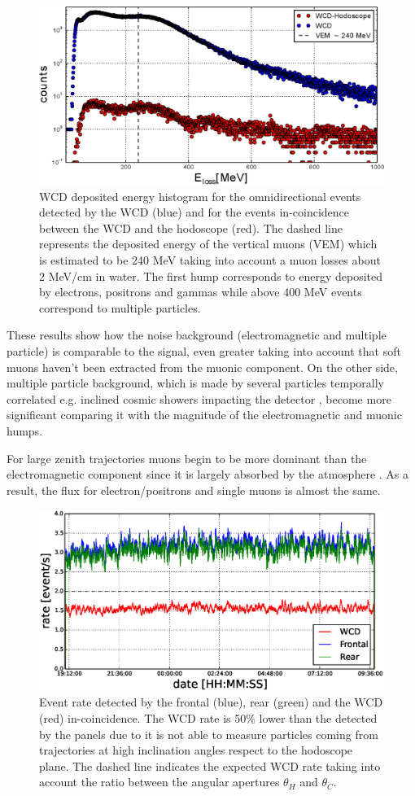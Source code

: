 \documentclass[letterpaper,11pt]{article}
\begin{document}
\begin{figure}[htb]
\centering
\includegraphics[width=0.7\columnwidth]{Figures/WCDHod.eps}
\caption{WCD deposited energy histogram for the omnidirectional events detected by the WCD (blue) and for the events in-coincidence between the WCD and the hodoscope (red). The dashed line represents the deposited energy of the vertical muons (VEM) which is estimated to be 240 MeV taking into account a muon losses about 2 MeV/cm in water. The first hump corresponds to energy deposited by electrons, positrons and gammas while above 400 MeV events correspond to multiple particles.}
\label{fig:WCDHod_rate}
\end{figure}

These results show how the noise background (electromagnetic and multiple particle) is comparable to the signal, even greater taking into account that soft muons haven't been extracted from the muonic component. On the other side, multiple particle background, which is made by several particles temporally correlated e.g. inclined cosmic showers impacting the detector \cite{Bonechi2019}, become more significant comparing it with the magnitude of the electromagnetic and muonic humps.

For large zenith trajectories muons begin to be more dominant than the electromagnetic component since it is largely absorbed by the atmosphere \cite{collaboration2014}. As a result, the flux for electron/positrons and single muons is almost the same.

\begin{figure}[htb]
\centering
\includegraphics[width=0.8\columnwidth]{Figures/HodWCDRate.eps}
\caption{Event rate detected by the frontal (blue), rear (green) and the WCD (red) in-coincidence. The WCD rate is 50$\%$ lower than the detected by the panels due to it is not able to measure particles coming from trajectories at high inclination angles respect to the hodoscope plane. The dashed line indicates the expected WCD rate taking into account the ratio between the angular apertures $\theta_H$ and $\theta_C$.}
\label{fig:RateWCDH}
\end{figure}
\end{document}
